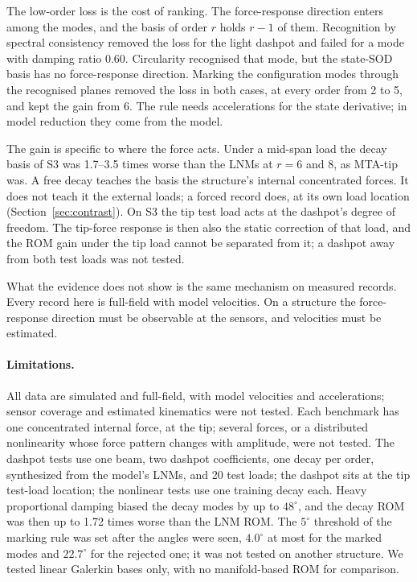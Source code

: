 \documentclass[preprint,12pt]{elsarticle}
\begin{document}
The low-order loss is the cost of ranking. The force-response direction enters among the modes, and the basis of order $r$ holds $r-1$ of them. Recognition by spectral consistency removed the loss for the light dashpot and failed for a mode with damping ratio 0.60. Circularity recognised that mode, but the state-SOD basis has no force-response direction. Marking the configuration modes through the recognised planes removed the loss in both cases, at every order from 2 to 5, and kept the gain from 6. The rule needs accelerations for the state derivative; in model reduction they come from the model.

The gain is specific to where the force acts. Under a mid-span load the decay basis of S3 was 1.7--3.5 times worse than the LNMs at $r=6$ and 8, as MTA-tip was. A free decay teaches the basis the structure's internal concentrated forces. It does not teach it the external loads; a forced record does, at its own load location (Section~\ref{sec:contrast}). On S3 the tip test load acts at the dashpot's degree of freedom. The tip-force response is then also the static correction of that load, and the ROM gain under the tip load cannot be separated from it; a dashpot away from both test loads was not tested.

What the evidence does not show is the same mechanism on measured records. Every record here is full-field with model velocities. On a structure the force-response direction must be observable at the sensors, and velocities must be estimated.

\paragraph{Limitations.} All data are simulated and full-field, with model velocities and accelerations; sensor coverage and estimated kinematics were not tested. Each benchmark has one concentrated internal force, at the tip; several forces, or a distributed nonlinearity whose force pattern changes with amplitude, were not tested. The dashpot tests use one beam, two dashpot coefficients, one decay per order, synthesized from the model's LNMs, and 20 test loads; the dashpot sits at the tip test-load location; the nonlinear tests use one training decay each. Heavy proportional damping biased the decay modes by up to $48^\circ$, and the decay ROM was then up to 1.72 times worse than the LNM ROM. The $5^\circ$ threshold of the marking rule was set after the angles were seen, $4.0^\circ$ at most for the marked modes and $22.7^\circ$ for the rejected one; it was not tested on another structure. We tested linear Galerkin bases only, with no manifold-based ROM \citep{Haller2016,Jain2017} for comparison.
\end{document}
